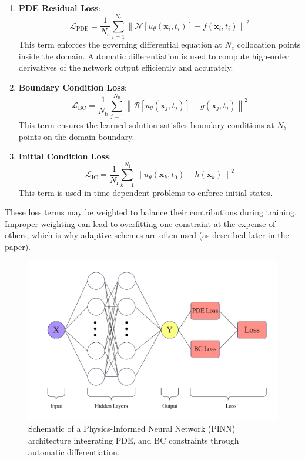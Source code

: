 \documentclass[twocolumn]{svjour3}
\begin{document}
	\begin{enumerate}
		\item \textbf{PDE Residual Loss}:
		\begin{equation}
			\mathcal{L}_{\text{PDE}} = \frac{1}{N_{\text{c}}} \sum_{i=1}^{N_{\text{c}}} 
			\left\| \mathcal{N}[u_\theta(\mathbf{x}_i, t_i)] - f(\mathbf{x}_i, t_i) \right\|^2
			\label{eq:pde_loss}
		\end{equation}
		This term enforces the governing differential equation at $N_c$ collocation points inside the domain. Automatic differentiation is used to compute high-order derivatives of the network output efficiently and accurately.
		
		\item \textbf{Boundary Condition Loss}:
		\begin{equation}
			\mathcal{L}_{\text{BC}} = \frac{1}{N_{\text{b}}} \sum_{j=1}^{N_{\text{b}}} 
			\left\| \mathcal{B}[u_\theta(\mathbf{x}_j, t_j)] - g(\mathbf{x}_j, t_j) \right\|^2
			\label{eq:bc_loss}
		\end{equation}
		This term ensures the learned solution satisfies boundary conditions at $N_b$ points on the domain boundary.
		
		\item \textbf{Initial Condition Loss}:
		\begin{equation}
			\mathcal{L}_{\text{IC}} = \frac{1}{N_{\text{i}}} \sum_{k=1}^{N_{\text{i}}} 
			\left\| u_\theta(\mathbf{x}_k, t_0) - h(\mathbf{x}_k) \right\|^2
			\label{eq:ic_loss}
		\end{equation}
		This term is used in time-dependent problems to enforce initial states.
	\end{enumerate}
	
	These loss terms may be weighted to balance their contributions during training. Improper weighting can lead to overfitting one constraint at the expense of others, which is why adaptive schemes are often used (as described later in the paper).
	
	\begin{figure}[htbp]
		\centering
		\includegraphics[width=\columnwidth]{fig.png}
		\caption{Schematic of a Physics-Informed Neural Network (PINN) architecture integrating PDE, and BC constraints through automatic differentiation.}\label{fig:pinn_schematic}
	\end{figure}
	
\end{document}
